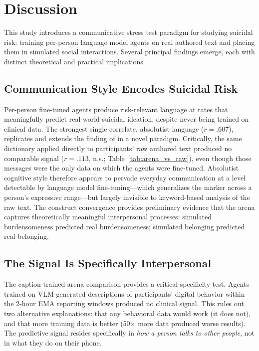 \documentclass[review,12pt,authoryear]{elsarticle}
\begin{document}
\section{Discussion}

This study introduces a communicative stress test paradigm for studying suicidal risk: training per-person language model agents on real authored text and placing them in simulated social interactions. Several principal findings emerge, each with distinct theoretical and practical implications.

\subsection{Communication Style Encodes Suicidal Risk}

Per-person fine-tuned agents produce risk-relevant language at rates that meaningfully predict real-world suicidal ideation, despite never being trained on clinical data. The strongest single correlate, absolutist language ($r = .607$), replicates and extends the finding of \citet{almosaiwi2018absolute} in a novel paradigm. Critically, the same dictionary applied directly to participants' raw authored text produced no comparable signal ($r = .113$, n.s.; Table~\ref{tab:arena_vs_raw}), even though those messages were the only data on which the agents were fine-tuned. Absolutist cognitive style therefore appears to pervade everyday communication at a level detectable by language model fine-tuning---which generalizes the marker across a person's expressive range---but largely invisible to keyword-based analysis of the raw text. The construct convergence provides preliminary evidence that the arena captures theoretically meaningful interpersonal processes: simulated burdensomeness predicted real burdensomeness; simulated belonging predicted real belonging.

\subsection{The Signal Is Specifically Interpersonal}

The caption-trained arena comparison provides a critical specificity test. Agents trained on VLM-generated descriptions of participants' digital behavior within the 2-hour EMA reporting windows produced no clinical signal. This rules out two alternative explanations: that any behavioral data would work (it does not), and that more training data is better (50$\times$ more data produced worse results). The predictive signal resides specifically in \textit{how a person talks to other people}, not in what they do on their phone.
\end{document}
